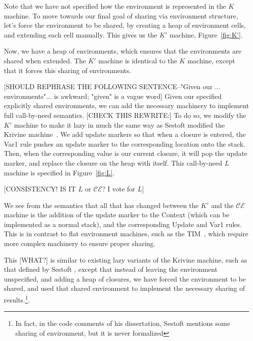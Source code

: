 \documentclass[preprint]{sigplanconf}
\begin{document}


Note that we have not specified how the environment is represented in the $K$
machine. To move towards our final goal of sharing via environment structure,
let's force the environment to be shared, by creating a heap of environment
cells, and extending each cell manually. This gives us the $K'$ machine,
Figure~\ref{fig:K'}.



Now, we have a heap of environments, which ensures that the
environments are shared when extended.  The $K'$ machine is identical to the $K$
machine, except that it forces this sharing of environments. 

[SHOULD REPHRASE THE FOLLOWING SENTENCE--"Given our ... environments"... is awkward; "given" is a vague word]
Given our specified explicitly shared environments, we can add the necessary
machinery to implement full call-by-need semantics.
[CHECK THIS REWRITE:] To do so, we modify the $K'$ machine to make it lazy
in much the same way as Sestoft modified the Krivine machine~\cite{sestoft}.
We add update markers so that when a closure is entered, the
Var1 rule pushes an update marker to the corresponding location onto the stack.
Then, when the corresponding value is our current closure, it will pop the
update marker, and replace the closure on the heap with itself. This
call-by-need $L$ machine is specified in Figure~\ref{fig:L}.



[CONSISTENCY! IS IT $L$ or $\mathcal{CE}$? I vote for $L$]

We see from the semantics that all that has changed between the $K'$ and the
$\mathcal{CE}$ machine is the addition of the update marker to the Context
(which can be implemented as a normal stack), and the corresponding Update and
Var1 rules. This is in contrast to flat environment machines, such as the TIM~\cite{TIM}, which require more
complex machinery to ensure proper sharing.

This [WHAT?] is similar to existing lazy variants of the Krivine machine, such as that
defined by Sestoft \cite{sestoft}, except that instead of leaving the
environment unspecified, and adding a heap of closures, we have forced the
environment to be shared, and used that shared environment to implement the
necessary sharing of results.\footnote{In fact, in the code comments of his
dissertation, Sestoft mentions some sharing of environment, but it is never
formalized}. 
\end{document}
